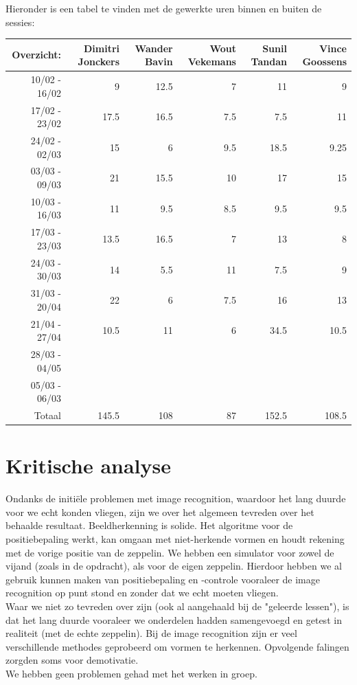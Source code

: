\documentclass[eind]{penoverslag}
\begin{document}
Hieronder is een tabel te vinden met de gewerkte uren binnen en buiten de sessies: \\

\begin{tabular}{r||r|r|r|r|r}
Overzicht: & Dimitri Jonckers & Wander Bavin & Wout Vekemans & Sunil Tandan & Vince Goossens \\
\hline \hline
10/02 - 16/02 & 9 & 12.5 & 7 & 11 & 9 \\
17/02 - 23/02 & 17.5 & 16.5 & 7.5 & 7.5 & 11 \\
24/02 - 02/03 & 15 & 6 & 9.5 & 18.5 & 9.25 \\
03/03 - 09/03 & 21 & 15.5 & 10 & 17 & 15 \\
10/03 - 16/03 & 11 & 9.5 & 8.5 & 9.5 & 9.5 \\
17/03 - 23/03 & 13.5 & 16.5 & 7 & 13 & 8 \\
24/03 - 30/03 & 14 & 5.5 & 11 & 7.5 & 9 \\
31/03 - 20/04 & 22 & 6 & 7.5 & 16 & 13 \\
21/04 - 27/04 & 10.5 & 11 & 6 & 34.5 & 10.5 \\
28/03 - 04/05 &  &  &  &  &  \\
05/03 - 06/03 &  &  &  &  &  \\
\hline \hline
Totaal & 145.5 & 108 & 87 & 152.5 & 108.5 \\
\end{tabular}


\section{Kritische analyse}
Ondanks de initi\"ele problemen met image recognition, waardoor het lang duurde voor we echt konden vliegen, zijn we over het algemeen tevreden over het behaalde resultaat. Beeldherkenning is solide. Het algoritme voor de positiebepaling werkt, kan omgaan met niet-herkende vormen en houdt rekening met de vorige positie van de zeppelin. We hebben een simulator voor zowel de vijand (zoals in de opdracht), als voor de eigen zeppelin. Hierdoor hebben we al gebruik kunnen maken van positiebepaling en -controle vooraleer de image recognition op punt stond en zonder dat we echt moeten vliegen. \\

Waar we niet zo tevreden over zijn (ook al aangehaald bij de "geleerde lessen"), is dat het lang duurde vooraleer we onderdelen hadden samengevoegd en getest in realiteit (met de echte zeppelin). Bij de image recognition zijn er veel verschillende methodes geprobeerd om vormen te herkennen. Opvolgende falingen zorgden soms voor demotivatie. \\

We hebben geen problemen gehad met het werken in groep.
\end{document}
